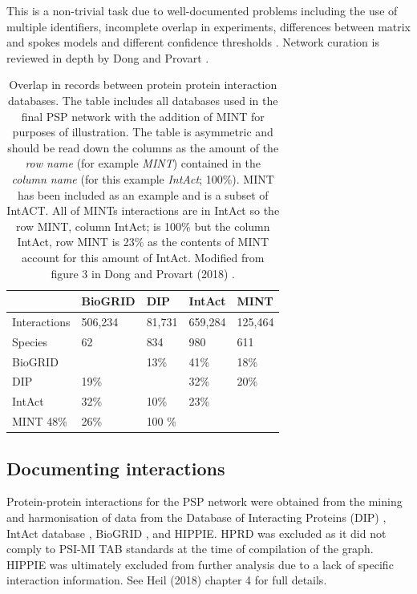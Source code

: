 This is a non-trivial task due to well-documented problems including the use of multiple identifiers, incomplete overlap in experiments, differences between matrix and spokes models and different confidence thresholds \cite{lehne2009protein}.  Network curation is reviewed in depth by Dong and Provart \cite{dong2018analyses}.

  \begin{table}[]
       \centering
       \begin{tabular}{lllll}
       \toprule
    &    BioGRID    & DIP & IntAct & MINT   \\
    \hline
    Interactions & 506,234 & 81,731 & 659,284 & 125,464\\
    \hline
    Species & 62 & 834 & 980 & 611 \\
    \midrule
    BioGRID &  & 13\% & 41\%& 18\%      \\
    DIP & 19\% & & 32\% &20\% \\
    IntAct& 32\% & 10\% & 23\% \\
    MINT 48\% & 26\% & 100 \% & \\
    \bottomrule
       \end{tabular}
       \caption[Overlap between protein-protein interaction databases]{Overlap in records between protein protein interaction databases. The table includes all databases used in the final PSP network with the addition of MINT for purposes of illustration. The table is asymmetric and should be read down the columns as the amount of the \textit{row name} (for example \textit{MINT}) contained in the \textit{column name} (for this example \textit{IntAct}; 100\%). MINT has been included as an example and is a subset of IntACT. All of MINTs interactions are in IntAct so the row MINT, column IntAct; is 100\% but the column IntAct, row MINT is 23\% as the contents of MINT account for this amount of IntAct. Modified from figure 3 in Dong and Provart (2018) \cite{dong2018analyses}.}
       \label{tab:overlap between protein interaction databases}
   \end{table}
 \subsection{Documenting interactions}
 Protein-protein interactions for the PSP network were obtained from the mining and harmonisation of data from the Database of Interacting Proteins (DIP) \cite{xenarios2002dip},  IntAct database \cite{orchard2014mintact},  BioGRID \cite{chatr2017biogrid}, and HIPPIE\cite{schaefer2012hippie}. HPRD\cite{keshava2009human} was excluded as it did not comply to PSI-MI TAB  standards at the time of compilation of the graph. HIPPIE was ultimately excluded from further analysis due to a lack of specific interaction information. See Heil (2018) \cite{heil2018systems} chapter 4 for full details. 
 
